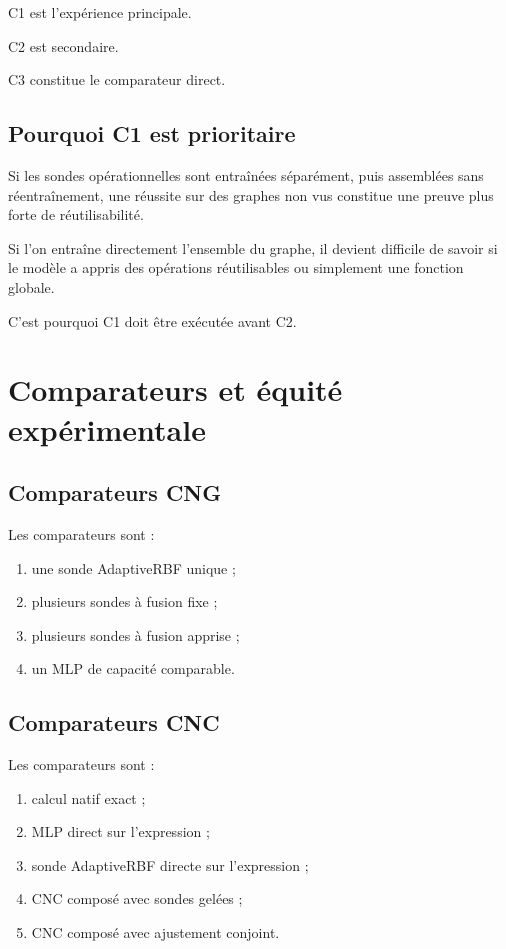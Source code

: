 \documentclass[11pt,a4paper]{article}
\begin{document}
C1 est l'expérience principale.

C2 est secondaire.

C3 constitue le comparateur direct.

\subsection{Pourquoi C1 est prioritaire}

Si les sondes opérationnelles sont entraînées séparément,
puis assemblées sans réentraînement, une réussite
sur des graphes non vus constitue une preuve plus forte
de réutilisabilité.

Si l'on entraîne directement l'ensemble du graphe,
il devient difficile de savoir si le modèle a appris
des opérations réutilisables ou simplement une fonction
globale.

C'est pourquoi C1 doit être exécutée avant C2.

\section{Comparateurs et équité expérimentale}

\subsection{Comparateurs CNG}

Les comparateurs sont :

\begin{enumerate}
    \item une sonde AdaptiveRBF unique ;
    \item plusieurs sondes à fusion fixe ;
    \item plusieurs sondes à fusion apprise ;
    \item un MLP de capacité comparable.
\end{enumerate}

\subsection{Comparateurs CNC}

Les comparateurs sont :

\begin{enumerate}
    \item calcul natif exact ;
    \item MLP direct sur l'expression ;
    \item sonde AdaptiveRBF directe sur l'expression ;
    \item CNC composé avec sondes gelées ;
    \item CNC composé avec ajustement conjoint.
\end{enumerate}
\end{document}
